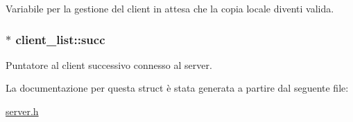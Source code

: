 Variabile per la gestione del client in attesa che la copia locale diventi valida. 

\hypertarget{structclient__list_b5efb920edea57018e99194c5ae42cff_b5efb920edea57018e99194c5ae42cff}{
\subsubsection[{succ}]{$\ast$ {\bf client\_\-list::succ}}}
\label{structclient__list_b5efb920edea57018e99194c5ae42cff_b5efb920edea57018e99194c5ae42cff}


Puntatore al client successivo connesso al server. 



La documentazione per questa struct è stata generata a partire dal seguente file:\begin{CompactItemize}
\item 
\hyperlink{server_8h}{server.h}\end{CompactItemize}
